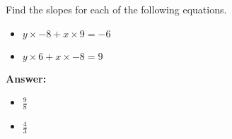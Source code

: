  Find the slopes for each of the following equations. \begin{itemize}\item \( y \times -8 + x \times 9 = -6 \)\item \( y \times 6 + x \times -8 = 9 \)\end{itemize}

        \textbf{Answer:} \begin{itemize}\item \( \frac{9}{8} \)\item \( \frac{4}{3} \)\end{itemize}
